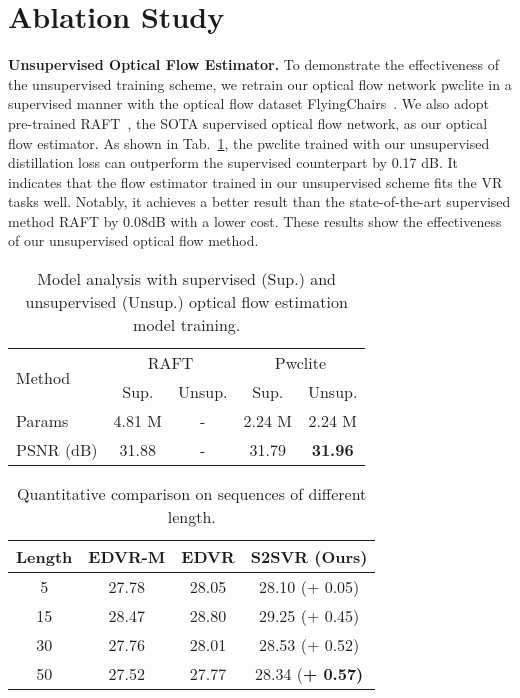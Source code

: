\documentclass[nohyperref]{article}
\theoremstyle{plain}
\theoremstyle{definition}
\theoremstyle{remark}
\begin{document}
\vspace{-3mm}
\section{Ablation Study}
\vspace{-1mm}
\noindent\textbf{Unsupervised Optical Flow Estimator.}
To demonstrate the effectiveness of the unsupervised training scheme, we retrain our optical flow network pwclite in a supervised manner with the optical flow dataset FlyingChairs~\cite{r80}. We also adopt pre-trained RAFT~\cite{r47}, the SOTA supervised optical flow network, as our optical flow estimator. As shown in Tab.~\ref{tab:unsupervised_optical}, the pwclite trained with our unsupervised distillation loss can outperform the supervised counterpart by 0.17 dB. It indicates that the flow estimator trained in our unsupervised scheme fits the VR tasks well. Notably, it achieves a better result than the state-of-the-art supervised method RAFT by 0.08dB with a lower cost. These results show the effectiveness of our unsupervised optical flow method.

\begin{table}[t]
\footnotesize
\center
\begin{center}
\begin{tabular}{l|cc|cc}
\hline  
 \multirow{2}{*}{Method} &  \multicolumn{2}{c|}{RAFT} &  \multicolumn{2}{c}{Pwclite}
\\
\cline{2-5}
 & \multicolumn{1}{c|}{Sup.} & Unsup.&  \multicolumn{1}{c|}{Sup.} & Unsup.
\\
\hline 
Params & 4.81 M  & - & 2.24 M  & 2.24 M  
\\
\hline
PSNR (dB) & 31.88 & - & 31.79 & \textbf{31.96}
\\
\hline  
\end{tabular}
\end{center}
\vspace{-3mm}
\caption{Model analysis with supervised (Sup.) and unsupervised (Unsup.) optical flow estimation model training.}
\label{tab:unsupervised_optical}
\vspace{-3mm}
\end{table}
 \begin{table}[t]
\scriptsize
\footnotesize
\centering
\begin{center}
\begin{tabular}{c|c|c|c}
\hline
\multirow{1}{*}{Length} &  EDVR-M  &  EDVR  &  \textbf{S2SVR (Ours)}  
\\
\hline 
5 & 27.78  & 28.05  & 28.10 (+ 0.05)  
\\
15 & 28.47  & 28.80 & 29.25 (+ 0.45)  
\\

30 & 27.76 & 28.01 & 28.53 (+ 0.52)  \\
50 &  27.52 &  27.77 & 28.34 (\bf + 0.57) 
\\ 
\hline 
\end{tabular}
\end{center}
\vspace{-4.5mm}
\caption{Quantitative comparison on sequences of different length.}
\label{tab:length}
\vspace{-6mm}
\end{table}
\end{document}
